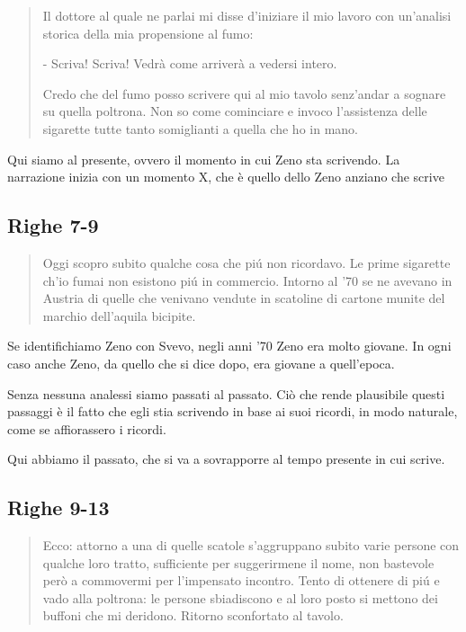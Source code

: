 \documentclass[a4paper, twoside, titlepage]{book}
\newcounter{mar}
\begin{document}
\begin{quotation}
Il dottore al quale ne parlai mi disse d’iniziare il mio lavoro con un’analisi storica della mia propensione al fumo:

- Scriva! Scriva! Vedrà come arriverà a vedersi intero.

Credo che del fumo posso scrivere qui al mio tavolo senz’andar a sognare su quella poltrona. Non so come cominciare e invoco l’assistenza delle sigarette tutte tanto somiglianti a quella che ho in mano.
\end{quotation}

Qui siamo al presente, ovvero il momento in cui Zeno sta scrivendo. La narrazione inizia con un momento X, che è quello dello Zeno anziano che scrive

\subsection*{Righe 7-9}

\begin{quotation}
Oggi scopro subito qualche cosa che piú non ricordavo. Le prime sigarette ch’io fumai non esistono piú in commercio. Intorno al ’70 se ne avevano in Austria di quelle che venivano vendute in scatoline di cartone munite del marchio dell’aquila bicipite.
\end{quotation}

Se identifichiamo Zeno con Svevo, negli anni '70 Zeno era molto giovane. In ogni caso anche Zeno, da quello che si dice dopo, era giovane a quell'epoca.

Senza nessuna analessi siamo passati al passato. Ciò che rende plausibile questi passaggi è il fatto che egli stia scrivendo in base ai suoi ricordi, in modo naturale, come se affiorassero i ricordi.

Qui abbiamo il passato, che si va a sovrapporre al tempo presente in cui scrive.

\subsection*{Righe 9-13}

\begin{quotation}
Ecco: attorno a una di quelle scatole s’aggruppano subito varie persone con qualche loro tratto, sufficiente per suggerirmene il nome, non bastevole però a commovermi per l’impensato incontro. Tento di ottenere di piú e vado alla poltrona: le persone sbiadiscono e al loro posto si mettono dei buffoni che mi deridono. Ritorno sconfortato al tavolo.
\end{quotation}
\end{document}
